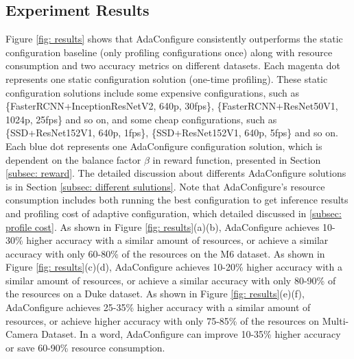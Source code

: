 \begin{table}[!t]
	\centering
	\label{tab: parameters}
	\caption{Experiment parameter}
	\label{tab: parameters}
\end{table}


\subsection{Experiment Results}
Figure \ref{fig: results} shows that AdaConfigure consistently outperforms the static configuration baseline (only profiling configurations once) along with resource consumption and two accuracy metrics on different datasets. Each magenta dot represents one static configuration solution (one-time profiling). These static configuration solutions include some expensive configurations, such as \{FasterRCNN+InceptionResNetV2, 640p, 30fps\}, \{FasterRCNN+ResNet50V1, 1024p, 25fps\} and so on, and some cheap configurations, such as \{SSD+ResNet152V1, 640p, 1fps\},  \{SSD+ResNet152V1, 640p, 5fps\} and so on. Each blue dot represents one AdaConfigure configuration solution, which is dependent on the balance factor $\beta$ in reward function, presented in Section \ref{subsec: reward}. The detailed discussion about differents AdaConfigure solutions is in Section \ref{subsec: different sulutions}. Note that AdaConfigure's resource consumption includes both running the best configuration to get inference results and profiling cost of adaptive configuration, which detailed discussed in \ref{subsec: profile cost}. As shown in Figure \ref{fig: results}(a)(b), AdaConfigure achieves 10-30\% higher accuracy with a similar amount of resources, or achieve a similar accuracy with only 60-80\% of the resources on the M6 dataset. As shown in Figure \ref{fig: results}(c)(d), AdaConfigure achieves 10-20\% higher accuracy with a similar amount of resources, or achieve a similar accuracy with only 80-90\% of the resources on a Duke dataset. As shown in Figure \ref{fig: results}(e)(f), AdaConfigure achieves 25-35\% higher accuracy with a similar amount of resources, or achieve higher accuracy with only 75-85\% of the resources on Multi-Camera Dataset. In a word, AdaConfigure can improve 10-35\% higher accuracy or save 60-90\% resource consumption.

